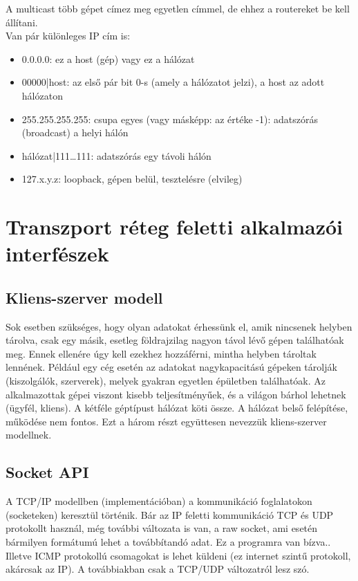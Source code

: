 \documentclass[fleqn,10pt,a4paper]{article}
\theoremstyle{magyar}
\begin{document}
  \noindent A multicast több gépet címez meg egyetlen címmel, de ehhez a routereket be kell állítani.\\
  
  \noindent Van pár különleges IP cím is:
  \begin{itemize}
  \item 0.0.0.0: ez a host (gép) vagy ez a hálózat
  \item 00000|host: az első pár bit 0-s (amely a hálózatot jelzi), a host az adott hálózaton
  \item 255.255.255.255: csupa egyes (vagy másképp: az értéke -1): adatszórás (broadcast) a helyi hálón
  \item hálózat|111\ldots111: adatszórás egy távoli hálón
  \item 127.x.y.z: loopback, gépen belül, tesztelésre (elvileg)
  \end{itemize}
  

  
  \newpage
  \section{Transzport réteg feletti alkalmazói interfészek}
  \subsection{Kliens-szerver modell}
  Sok esetben szükséges, hogy olyan adatokat érhessünk el, amik nincsenek helyben tárolva, csak egy másik, esetleg
  földrajzilag nagyon távol lévő gépen találhatóak meg. Ennek ellenére úgy kell ezekhez hozzáférni, mintha helyben
  tároltak lennének. Például egy cég esetén az adatokat nagykapacitású gépeken tárolják (kiszolgálók, szerverek), melyek
  gyakran egyetlen épületben találhatóak. Az alkalmazottak gépei viszont kisebb teljesítményűek, és a világon bárhol
  lehetnek (ügyfél, kliens). A kétféle géptípust hálózat köti össze. A hálózat belső felépítése, működése nem
  fontos. Ezt a három részt együttesen nevezzük kliens-szerver modellnek.

  \subsection{Socket API}
  A TCP/IP modellben (implementációban) a kommunikáció foglalatokon (socketeken) keresztül történik. Bár az IP feletti
  kommunikáció TCP és UDP protokollt használ, még további változata is van, a raw socket, ami esetén bármilyen formátumú lehet
  a továbbítandó adat. Ez a programra van bízva.. Illetve ICMP protokollú csomagokat is lehet küldeni (ez internet
  szintű protokoll, akárcsak az IP). A továbbiakban csak a  TCP/UDP változatról lesz szó.
\end{document}
